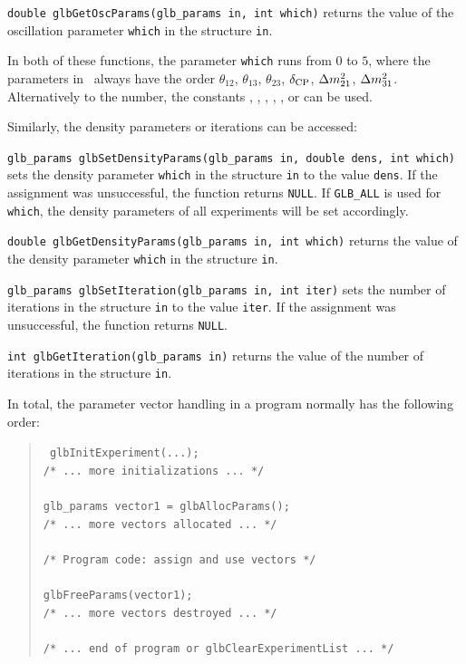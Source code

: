 \begin{function}
{\tt double glbGetOscParams(glb\_params in, int which)}
returns the value of the oscillation parameter {\tt which} in the 
structure {\tt in}.
\end{function}
In both of these functions, the parameter {\tt which} runs from
$0$ to $5$, where the parameters in \GLOBES\ always have the order $\theta_{12}$, $\theta_{13}$, $\theta_{23}$, $\delta_{\mathrm{CP}}$, $\Delta m_{21}^2$, $\Delta m_{31}^2$.
Alternatively to the number, the constants , , , , 
, or  can be used.

Similarly, the density parameters or iterations can be accessed:
\begin{function}
{\tt glb\_params glbSetDensityParams(glb\_params in, double dens, int which)} sets the density parameter {\tt which} in the structure {\tt in}
to the value {\tt dens}. If the assignment was unsuccessful, the 
function returns {\tt NULL}. If {\tt GLB\_ALL} is used for {\tt which},
the density parameters of all experiments will be set accordingly.
\end{function}
\begin{function}
{\tt double glbGetDensityParams(glb\_params in, int which)}
returns the value of the density parameter {\tt which} in the 
structure {\tt in}.
\end{function}
\begin{function}
{\tt glb\_params glbSetIteration(glb\_params in, int iter)} sets the number of iterations in the structure {\tt in}
to the value {\tt iter}. If the assignment was unsuccessful, the 
function returns {\tt NULL}.
\end{function}
\begin{function}
{\tt int glbGetIteration(glb\_params in)}
returns the value of the number of iterations in the 
structure {\tt in}.
\end{function}
In total, the parameter vector handling in a program normally has the
following order:
\begin{quote}
{\tt
glbInitExperiment(...); \\
/* ... more initializations ... */ \\
\\
glb\_params vector1 = glbAllocParams(); \\
/* ... more vectors allocated ... */ \\
\\
/* Program code: assign and use vectors */ \\
\\
glbFreeParams(vector1); \\
/* ... more vectors destroyed ... */ \\
\\
/* ... end of program or glbClearExperimentList ... */ 
}
\end{quote}

